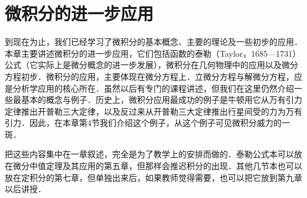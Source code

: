 \chapter{微积分的进一步应用}\label{chap:08}

到现在为止，我们已经学习了微积分的基本概念、主要的理论及一些初步的应用．本章主要讲述微积分的进一步应用，它们包括函数的泰勒（Taylor，1685---1731）公式（它实际上是微分概念的进一步发展），微积分在几何物理中的应用以及微分方程初步．微积分的应用，主要体现在微分方程上．立微分方程与解微分方程，应是分析学应用的核心所在．虽然以后有专门的课程讲述，但我们在这里仍然介绍一些最基本的概念与例子．历史上，微积分应用最成功的例子是牛顿用它从万有引力定律推出开普勒三大定律，以及反过来从开普勒三大定律推出行星间受的力为万有引力．因此，在本章第4节我们介绍这个例子，从这个例子可见微积分威力的一斑．

把这些内容集中在一章叙述，完全是为了教学上的安排而做的．泰勒公式本可以放在微分中值定理及其应用的第五章，但那样会推迟积分的出现．其他几节本也可以放在定积分的第七章，但单独出来后，如果教师觉得需要，也可以把它放到第九章以后讲授．





